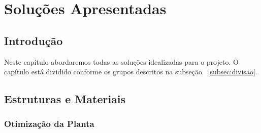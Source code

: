 \part{Soluções Apresentadas}
\label{sol}
\chapter[Introdução]{Introdução}
Neste capítulo abordaremos todas as soluções idealizadas para o projeto. O capítulo está dividido conforme os grupos descritos na subseção ~\ref{subsec:divisao}.

\chapter[Estruturas e Materiais]{Estruturas e Materiais}

\section{Otimização da Planta}

